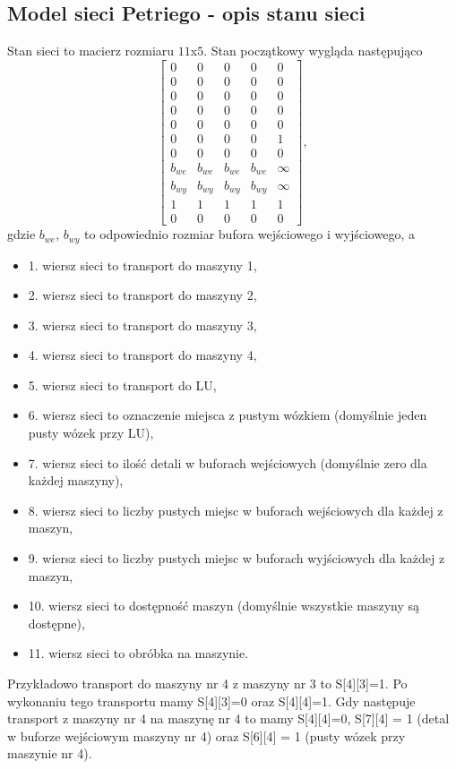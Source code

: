 \documentclass[10pt, a4paper]{article}
\begin{document}
\subsection{Model sieci Petriego - opis stanu sieci}
Stan sieci to macierz rozmiaru $11$x$ 5$. Stan początkowy wygląda następująco
\begin{equation}
\left[\begin{array}{ccccc}
0 & 0 & 0 & 0&0\\
0 &0 &0 &0&0\\
0 &0 &0 &0&0\\
0 &0 &0 &0&0\\
0 &0 &0 &0&0\\
0 &0 &0 &0 &1\\
0 &0 &0 &0&0\\
b_{we}&b_{we}&b_{we}&b_{we} & \infty\\
b_{wy}&b_{wy}&b_{wy}&b_{wy} & \infty\\
1&1&1&1 &1\\
0 &0 &0 &0 &0
\end{array}\right],
\end{equation}
gdzie $b_{we}$, $b_{wy}$ to odpowiednio rozmiar bufora wejściowego i wyjściowego, a
\begin{itemize}
\item 1. wiersz sieci to transport do maszyny 1,
\item 2. wiersz sieci to transport do maszyny 2,
\item 3. wiersz sieci to transport do maszyny 3,
\item 4. wiersz sieci to transport do maszyny 4,
\item 5. wiersz sieci to transport do LU,
\item 6. wiersz sieci to oznaczenie miejsca z pustym wózkiem (domyślnie jeden pusty wózek przy LU),
\item 7. wiersz sieci to ilość detali w buforach wejściowych (domyślnie zero dla każdej maszyny),
\item 8. wiersz sieci to liczby pustych miejsc w buforach wejściowych dla każdej z maszyn,
\item 9. wiersz sieci to liczby pustych miejsc w buforach wyjściowych dla każdej z maszyn,
\item 10. wiersz sieci to dostępność maszyn (domyślnie wszystkie maszyny są dostępne),
\item 11. wiersz sieci to obróbka na maszynie.
\end{itemize}
Przykładowo transport do maszyny nr 4 z maszyny nr 3 to S[4][3]=1. Po wykonaniu tego transportu mamy S[4][3]=0 oraz S[4][4]=1. Gdy następuje transport z maszyny nr 4 na maszynę nr 4 to mamy S[4][4]=0, S[7][4] = 1 (detal w buforze wejściowym maszyny nr 4) oraz S[6][4] = 1 (pusty wózek przy maszynie nr 4).
\end{document}
